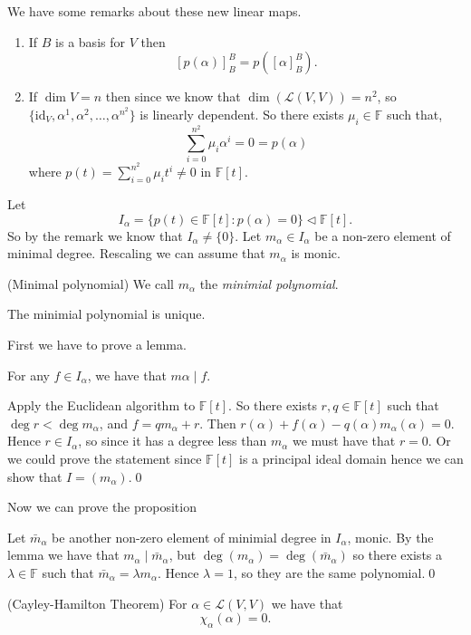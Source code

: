 \documentclass{article}
\newcommand{\F}{\mathbb{F}}
\renewcommand{\id}{\mathrm{id}}
\begin{document}
\begin{remark}
  We have some remarks about these new linear maps.
  \begin{enumerate}
	  \item If $ B $ is a basis for $ V $ then
		  \[
			  [p(\alpha)]^B_B=p([\alpha]^B_B).
		  \]
	  \item If $ \dim V=n $ then since we know that $ \dim(\mathcal L(V,V))=n^2 $, so $ \{\id_V,\alpha^1,\alpha^2,\dots, \alpha^{n^2}\} $ is linearly dependent. So there exists $ \mu_i\in\F $ such that,
		  \[
			  \sum_{i=0}^{n^2}\mu_i\alpha^i=0=p(\alpha)
		  \]
		  where $ p(t)=\sum_{i=0}^{n^2}\mu_it^i\ne 0 $ in $ \F[t] $.
  \end{enumerate}
\end{remark}
Let
\[
I_\alpha=\{p(t)\in \F[t]: p(\alpha)=0 \}\triangleleft \F[t]. 
\]
So by the remark we know that $ I_\alpha\ne \{0\} $. Let $ m_\alpha\in I_\alpha $ be a non-zero element of minimal degree. Rescaling we can assume that $ m_\alpha $ is monic.
\begin{definition}
(Minimal polynomial) We call $ m_\alpha $ the \textit{minimial polynomial}.
\end{definition}
\begin{proposition}
  The minimial polynomial is unique.
\end{proposition}
First we have to prove a lemma.
\begin{lemma}
  For any $ f\in I_\alpha $, we have that $ m\alpha\mid f $.
\end{lemma}
\pf Apply the Euclidean algorithm to $ \F[t] $. So there exists $ r,q\in \F[t] $ such that $ \deg r<\deg m_\alpha $, and $ f=qm_\alpha+r $. Then $ r(\alpha)+f(\alpha)-q(\alpha)m_\alpha(\alpha)=0 $. Hence $ r\in I_\alpha $, so since it has a degree less than $ m_\alpha $ we must have that $ r=0 $. Or we could prove the statement since $ \F[t] $ is a principal ideal domain hence we can show that $ I=(m_\alpha) $.\qed
\par
Now we can prove the proposition\par
\pf Let $ \bar m_\alpha $ be another non-zero element of minimial degree in $ I_\alpha $, monic. By the lemma we have that $ m_\alpha\mid \bar m_\alpha $, but $ \deg(m_\alpha)=\deg(\bar m_\alpha) $ so there exists a $ \lambda\in \F $ such that $ \bar m_\alpha=\lambda m_\alpha $. Hence $ \lambda=1 $, so they are the same polynomial.\qed
\begin{theorem}
	(Cayley-Hamilton Theorem) For $ \alpha\in \mathcal L(V,V) $ we have that
	\[
	  \chi_\alpha(\alpha)=0.
	\]
\end{theorem}
\end{document}
